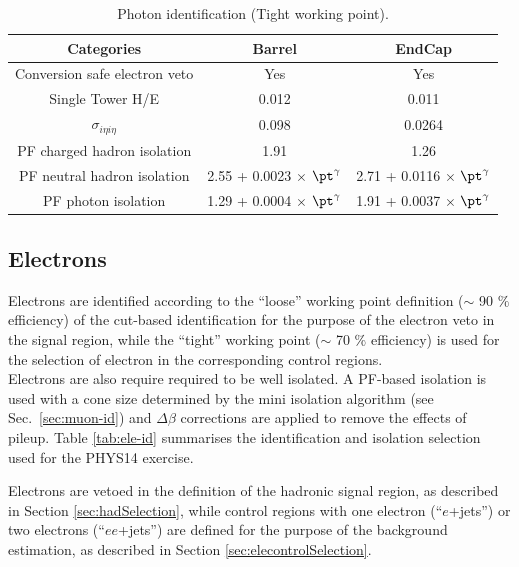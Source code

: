 \begin{table}[ht!]
  \caption{Photon identification (Tight working point).\label{tab:photon-id-gamma}}
  \centering
  \footnotesize
  \begin{tabular}{ ccc }
    \hline
    \hline
    Categories                    & Barrel                             & EndCap                             \\
    \hline
    Conversion safe electron veto & Yes                                & Yes                                \\
    Single Tower H/E              & 0.012                              & 0.011                               \\
    $\sigma_{i\eta i\eta}$        & 0.098                              & 0.0264                               \\
    PF charged hadron isolation   & 1.91                               & 1.26                               \\
    PF neutral hadron isolation   & 2.55 + 0.0023 $\times$ $\pt^{\gamma}$  & 2.71 + 0.0116 $\times$ $\pt^{\gamma}$  \\
    PF photon isolation           & 1.29 + 0.0004 $\times$ $\pt^{\gamma}$ & 1.91 + 0.0037 $\times$ $\pt^{\gamma}$ \\
    \hline
    \hline
  \end{tabular}
  \end{table}


\subsection{Electrons}
\label{sec:electron-id}
Electrons are identified according to the ``loose'' working point definition ($\sim$ 90 $\%$ efficiency) 
of the cut-based identification \cite{electron-id} for the purpose of the electron veto in the signal region, while the ``tight'' working point ($\sim$ 70 $\%$ efficiency) is used for the selection of electron in the corresponding control regions. \\
Electrons are also require required to be well isolated. 
A PF-based isolation \cite{pf-photon} is used with a cone size determined by the mini isolation algorithm (see Sec.~\ref{sec:muon-id}) and $\Delta \beta$ corrections are applied to remove the effects of pileup. 
Table \ref{tab:ele-id} summarises the identification and isolation selection used for the PHYS14 exercise.

Electrons are vetoed in the definition of the hadronic signal region, 
as described in Section \ref{sec:hadSelection}, while 
control regions with one electron (``$e$+jets'') or two electrons (``$ee$+jets'') are defined for the purpose of the background estimation, 
as described in Section \ref{sec:elecontrolSelection}.


